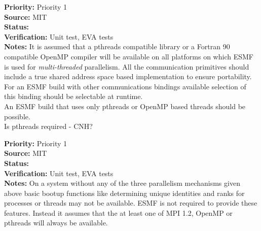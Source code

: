 \begin{reqlist}
{\bf Priority:} Priority 1 \\
{\bf Source:}  MIT \\
{\bf Status:}  \\
{\bf Verification:} Unit test, EVA tests \\
{\bf Notes:}  It is assumed that a pthreads compatible library
or a Fortran 90 compatible OpenMP compiler
will be available on all platforms on which ESMF is used
for {\it multi-threaded} parallelism. All the {\bf \shortname}
communication primitives should include a true shared address space based
implementation to ensure portability. \\
For an ESMF build with other communications bindings available
selection of this binding should be selectable at runtime.\\
An ESMF build that uses only pthreads or OpenMP based threads should be possible.\\
Is pthreads required - CNH?
\end{reqlist}

\begin{reqlist}
{\bf Priority:} Priority 1 \\
{\bf Source:}  MIT \\
{\bf Status:}  \\
{\bf Verification:} Unit test, EVA tests \\
{\bf Notes:} On a system without any of the three parallelism
mechanisms given above basic bootup functions like determining
unique identities and ranks for processes or threads may not be available.
ESMF is not required to provide these features. Instead it assumes that
the at least one of MPI 1.2, OpenMP or pthreads will always be available.
\end{reqlist}

